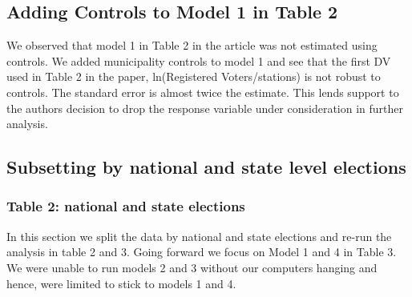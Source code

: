 \documentclass[12pt]{article}
\begin{document}
\subsection{Adding Controls to Model 1 in Table 2}
We observed that model 1 in Table 2 in the article was not estimated using controls. We added municipality controls to model 1 and see that the first DV used in Table 2 in the paper, ln(Registered Voters/stations) is not robust to controls. The standard  error is almost twice the estimate. This lends support to the authors decision to drop the response variable under consideration in further analysis.   

\singlespacing
\FloatBarrier
\begin{table}[]
    \caption*{Extension of Table 2, Column 1 with Controls Added}
    \centering
{}
\end{table}
\FloatBarrier

\doublespacing
\subsection{Subsetting by national and state level elections}
\subsubsection{Table 2: national and state elections}
In this section we split the data by national and state elections and re-run the analysis in table 2 and 3. Going forward we focus on Model 1 and 4 in Table 3. We were unable to run models 2 and 3 without our computers hanging and hence, were limited to stick to models 1 and 4. 
\end{document}

